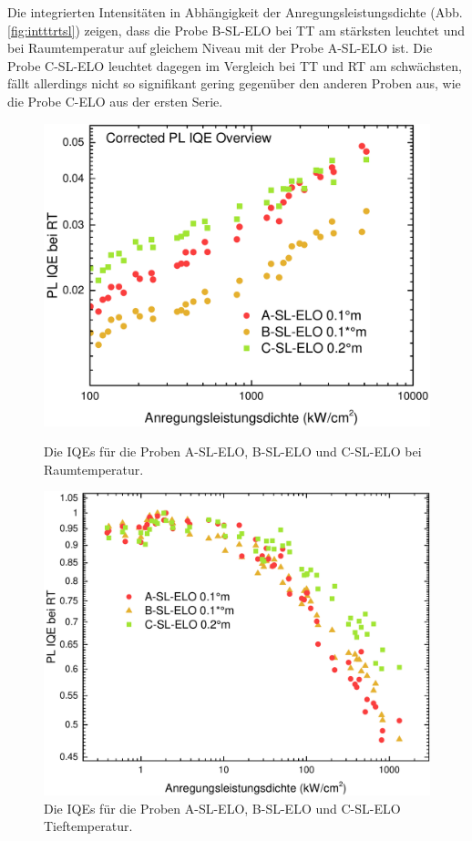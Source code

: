 \noindent 
% 
Die integrierten Intensitäten in Abhängigkeit der Anregungsleistungsdichte (Abb. \ref{fig:intttrtsl}) zeigen, dass die Probe B-SL-ELO bei TT am stärksten leuchtet und bei Raumtemperatur auf gleichem Niveau mit der Probe A-SL-ELO ist. Die Probe C-SL-ELO leuchtet dagegen im Vergleich bei TT und RT am schwächsten, fällt allerdings nicht so signifikant gering gegenüber den anderen Proben aus, wie die Probe C-ELO aus der ersten Serie.
%
\begin{figure}[H]
  \centering
  \begin{minipage}[t]{0.49\textwidth}
    \centering
    \includegraphics[width=\textwidth]{Bilder/TS4048/corrIQERT.pdf}
		\caption{Die IQEs für die Proben A-SL-ELO, B-SL-ELO und C-SL-ELO bei Raumtemperatur.}
    \label{fig:eloiqeRT}
  \end{minipage}
	\hfill
  \begin{minipage}[t]{0.49\textwidth}
    \centering
    \includegraphics[width=\linewidth]{Bilder/TS4048/IQETT.pdf}
		\caption{Die IQEs für die Proben A-SL-ELO, B-SL-ELO und C-SL-ELO Tieftemperatur.}
    \label{fig:slelocorriqeRT}
  \end{minipage}
\end{figure}
